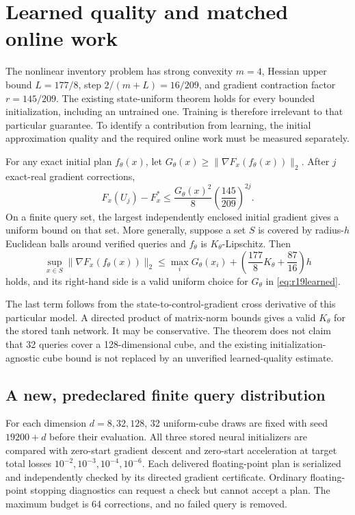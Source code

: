 \section{Learned quality and matched online work}\label{sec:r19warm}
The nonlinear inventory problem has strong convexity $m=4$, Hessian upper bound $L=177/8$, step $2/(m+L)=16/209$, and gradient contraction factor $r=145/209$. The existing state-uniform theorem holds for every bounded initialization, including an untrained one. Training is therefore irrelevant to that particular guarantee. To identify a contribution from learning, the initial approximation quality and the required online work must be measured separately.

\begin{theorem}\label{thm:r19learned}
For any exact initial plan $f_\theta(x)$, let $G_\theta(x)\geq\|\nabla F_x(f_\theta(x))\|_2$. After $j$ exact-real gradient corrections,
\begin{equation}
 F_x(U_j)-F_x^*\leq\frac{G_\theta(x)^2}{8}\left(\frac{145}{209}\right)^{2j}.
 \label{eq:r19learned}
\end{equation}
On a finite query set, the largest independently enclosed initial gradient gives a uniform bound on that set. More generally, suppose a set $S$ is covered by radius-$h$ Euclidean balls around verified queries and $f_\theta$ is $K_\theta$-Lipschitz. Then
\[
 \sup_{x\in S}\|\nabla F_x(f_\theta(x))\|_2
 \leq\max_iG_\theta(x_i)+\left(\frac{177}{8}K_\theta+\frac{87}{16}\right)h
\]
holds, and its right-hand side is a valid uniform choice for $G_\theta$ in \eqref{eq:r19learned}.
\end{theorem}
The last term follows from the state-to-control-gradient cross derivative of this particular model. A directed product of matrix-norm bounds gives a valid $K_\theta$ for the stored tanh network. It may be conservative. The theorem does not claim that 32 queries cover a 128-dimensional cube, and the existing initialization-agnostic cube bound is not replaced by an unverified learned-quality estimate.

\subsection{A new, predeclared finite query distribution}
For each dimension $d=8,32,128$, 32 uniform-cube draws are fixed with seed $19200+d$ before their evaluation. All three stored neural initializers are compared with zero-start gradient descent and zero-start acceleration at target total losses $10^{-2},10^{-3},10^{-4},10^{-6}$. Each delivered floating-point plan is serialized and independently checked by its directed gradient certificate. Ordinary floating-point stopping diagnostics can request a check but cannot accept a plan. The maximum budget is 64 corrections, and no failed query is removed.


